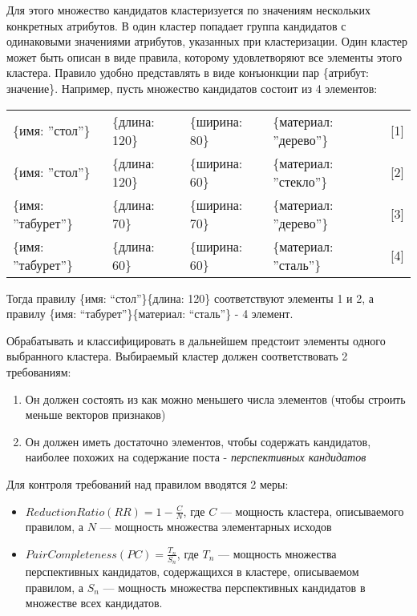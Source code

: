 Для этого множество кандидатов кластеризуется по значениям нескольких конкретных атрибутов. В один кластер попадает группа кандидатов с одинаковыми значениями атрибутов, указанных при кластеризации. Один кластер может быть описан в виде правила, которому удовлетворяют все элементы этого кластера. Правило удобно представлять в виде конъюнкции пар \{атрибут: значение\}. Например, пусть множество кандидатов состоит из 4 элементов:

\begin{tabular}{l l l l l}
	\{имя: ”стол”\} & \{длина: 120\} & \{ширина: 80\} & \{материал: ”дерево”\} & [1]\\
	\{имя: ”стол”\} & \{длина: 120\} & \{ширина: 60\} & \{материал: ”стекло”\} & [2]\\
	\{имя: ”табурет”\} & \{длина: 70\} & \{ширина: 70\} & \{материал: ”дерево”\} & [3]\\
	\{имя: ”табурет”\} & \{длина: 60\} & \{ширина: 60\} & \{материал: ”сталь”\} & [4]\\
\end{tabular}
\linebreak
Тогда правилу \{имя: “стол”\}\{длина: 120\} соответствуют элементы 1 и 2, а правилу \{имя: “табурет”\}\{материал: “сталь”\} - 4 элемент. 

Обрабатывать и классифицировать в дальнейшем предстоит элементы одного выбранного кластера. Выбираемый кластер должен соответствовать 2 требованиям:
\begin{enumerate}
	\item Он должен состоять из как можно меньшего числа элементов (чтобы строить меньше векторов признаков)
	\item Он должен иметь достаточно элементов, чтобы содержать кандидатов, наиболее похожих на содержание поста - \textit{перспективных кандидатов}
\end{enumerate}

Для контроля требований над правилом вводятся 2 меры: 
\begin{itemize}
	\item $Reduction Ratio (RR) = 1 - \frac{C}{N}$, где $C$ --- мощность кластера, описываемого правилом, а $N$ --- мощность множества элементарных исходов
	\item $Pair Completeness (PC) = \frac{T_n}{S_n}$, где $T_n$ --- мощность множества перспективных кандидатов, содержащихся в кластере, описываемом правилом, а $S_n$ --- мощность множества перспективных кандидатов в множестве всех кандидатов.
\end{itemize}

